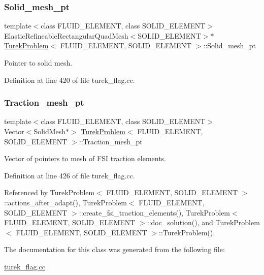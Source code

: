 \subsubsection{\texorpdfstring{Solid\+\_\+mesh\+\_\+pt}{Solid\_mesh\_pt}}
{\footnotesize\ttfamily template$<$class F\+L\+U\+I\+D\+\_\+\+E\+L\+E\+M\+E\+NT, class S\+O\+L\+I\+D\+\_\+\+E\+L\+E\+M\+E\+NT$>$ \\
Elastic\+Refineable\+Rectangular\+Quad\+Mesh$<$S\+O\+L\+I\+D\+\_\+\+E\+L\+E\+M\+E\+NT$>$$\ast$ \hyperlink{classTurekProblem}{Turek\+Problem}$<$ F\+L\+U\+I\+D\+\_\+\+E\+L\+E\+M\+E\+NT, S\+O\+L\+I\+D\+\_\+\+E\+L\+E\+M\+E\+NT $>$\+::Solid\+\_\+mesh\+\_\+pt\hspace{0.3cm}{\ttfamily [private]}}



Pointer to solid mesh. 



Definition at line 420 of file turek\+\_\+flag.\+cc.

\mbox{\label{classTurekProblem_a0b8588d0f133ffb9a281c5747786f95f}} 
\subsubsection{\texorpdfstring{Traction\+\_\+mesh\+\_\+pt}{Traction\_mesh\_pt}}
{\footnotesize\ttfamily template$<$class F\+L\+U\+I\+D\+\_\+\+E\+L\+E\+M\+E\+NT, class S\+O\+L\+I\+D\+\_\+\+E\+L\+E\+M\+E\+NT$>$ \\
Vector$<$Solid\+Mesh$\ast$$>$ \hyperlink{classTurekProblem}{Turek\+Problem}$<$ F\+L\+U\+I\+D\+\_\+\+E\+L\+E\+M\+E\+NT, S\+O\+L\+I\+D\+\_\+\+E\+L\+E\+M\+E\+NT $>$\+::Traction\+\_\+mesh\+\_\+pt\hspace{0.3cm}{\ttfamily [private]}}



Vector of pointers to mesh of F\+SI traction elements. 



Definition at line 426 of file turek\+\_\+flag.\+cc.



Referenced by Turek\+Problem$<$ F\+L\+U\+I\+D\+\_\+\+E\+L\+E\+M\+E\+N\+T, S\+O\+L\+I\+D\+\_\+\+E\+L\+E\+M\+E\+N\+T $>$\+::actions\+\_\+after\+\_\+adapt(), Turek\+Problem$<$ F\+L\+U\+I\+D\+\_\+\+E\+L\+E\+M\+E\+N\+T, S\+O\+L\+I\+D\+\_\+\+E\+L\+E\+M\+E\+N\+T $>$\+::create\+\_\+fsi\+\_\+traction\+\_\+elements(), Turek\+Problem$<$ F\+L\+U\+I\+D\+\_\+\+E\+L\+E\+M\+E\+N\+T, S\+O\+L\+I\+D\+\_\+\+E\+L\+E\+M\+E\+N\+T $>$\+::doc\+\_\+solution(), and Turek\+Problem$<$ F\+L\+U\+I\+D\+\_\+\+E\+L\+E\+M\+E\+N\+T, S\+O\+L\+I\+D\+\_\+\+E\+L\+E\+M\+E\+N\+T $>$\+::\+Turek\+Problem().



The documentation for this class was generated from the following file\+:\begin{DoxyCompactItemize}
\item 
\hyperlink{turek__flag_8cc}{turek\+\_\+flag.\+cc}\end{DoxyCompactItemize}
